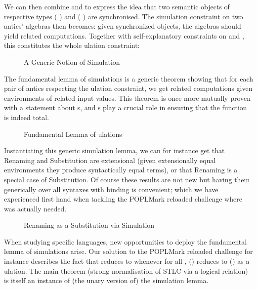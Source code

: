 We can then combine  and  to express the idea
that two semantic objects of respective types
   (  ) and
   (  ) are
synchronised. The simulation constraint on two antics' algebras
then becomes: given synchronized objects, the algebras should yield
related computations. Together with self-explanatory constraints on
 and , this constitutes the whole ulation
constraint:

\begin{figure}[h]
\caption{A Generic Notion of Simulation}
\end{figure}

The fundamental lemma of simulations is a generic theorem showing that for
each pair of antics respecting the ulation constraint, we
get related computations given environments of related input values. This
theorem is once more mutually proven with a statement about s,
and s play a crucial role in ensuring that the function is indeed total.

\begin{figure}[h]
\caption{Fundamental Lemma of ulations}
\end{figure}

Instantiating this generic simulation lemma, we can for instance get
that Renaming and Substitution are extensional (given extensionally
equal environments they produce syntactically equal terms), or that
Renaming is a special case of Substitution. Of course these results
are not new but having them generically over all syntaxes with binding
is convenient; which we have experienced first hand when tackling the
POPLMark reloaded challenge where  was actually needed.

\begin{figure}[h]
\caption{Renaming as a Substitution via Simulation}
\end{figure}

When studying specific languages, new opportunities to deploy the
fundamental lemma of simulations arise. Our solution to the POPLMark
reloaded challenge for instance describes the fact that { \AB{\rho} }
reduces to {  } whenever for all ,
\AB{\rho}() reduces to () as a ulation.
The main theorem (strong normalisation of STLC via a logical relation)
is itself an instance of (the unary version of) the simulation lemma.

